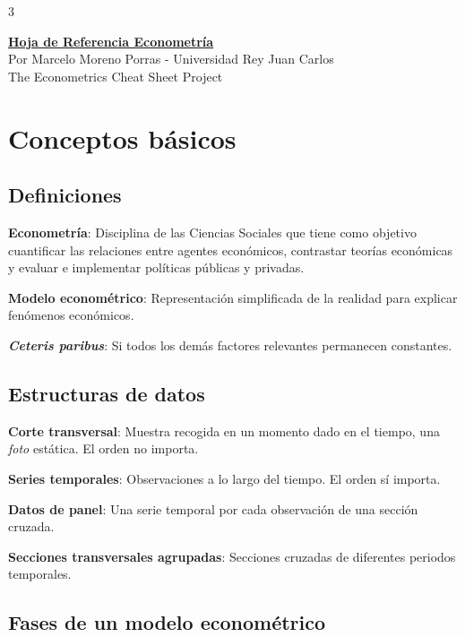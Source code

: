 \documentclass[10pt, a4paper, landscape]{article}
\begin{document}
\begin{multicols}{3}

\begin{center}
	\textbf{\LARGE \href{https://github.com/marcelomijas/econometrics-cheatsheet}{Hoja de Referencia Econometría}} \\
	{\footnotesize Por Marcelo Moreno Porras - Universidad Rey Juan Carlos} \\
	{\footnotesize The Econometrics Cheat Sheet Project}
\end{center}

\section*{Conceptos básicos}

\subsection*{Definiciones}

\textbf{Econometría}: Disciplina de las Ciencias Sociales que tiene como objetivo cuantificar las relaciones entre agentes económicos, contrastar teorías económicas y evaluar e implementar políticas públicas y privadas.

\textbf{Modelo econométrico}: Representación simplificada de la realidad para explicar fenómenos económicos.

\textbf{\textsl{Ceteris paribus}}: Si todos los demás factores relevantes permanecen constantes.

\subsection*{Estructuras de datos}

\textbf{Corte transversal}: Muestra recogida en un momento dado en el tiempo, una \textsl{foto} estática. El orden no importa.

\textbf{Series temporales}: Observaciones a lo largo del tiempo. El orden sí importa.

\textbf{Datos de panel}: Una serie temporal por cada observación de una sección cruzada.

\textbf{Secciones transversales agrupadas}: Secciones cruzadas de diferentes periodos temporales.

\subsection*{Fases de un modelo econométrico}


\end{multicols}
\end{document}
